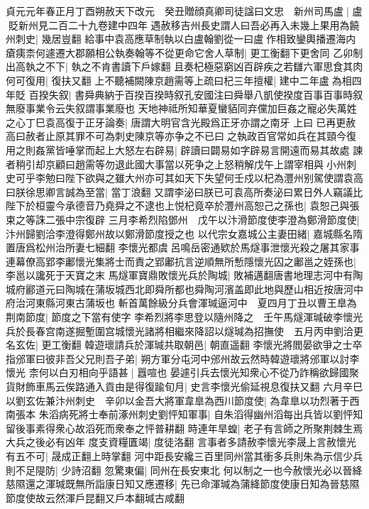 貞元元年春正月丁酉朔赦天下改元　癸丑贈顔真卿司徒諡曰文忠　新州司馬盧|{
	盧貶新州見二百二十九卷建中四年}
遇赦移吉州長史謂人曰吾必再入未幾上果用為饒州刺史|{
	幾居豈翻}
給事中袁高應草制執以白盧翰劉從一曰盧作相致鑾輿播遷海内瘡痍柰何遽遷大郡願相公執奏翰等不從更命它舍人草制|{
	更工衡翻下更舍同}
乙卯制出高執之不下|{
	執之不肯書讀下戶嫁翻}
且奏杞極惡窮凶百辟疾之若讎六軍思食其肉何可復用|{
	復扶又翻}
上不聽補闕陳京趙需等上疏曰杞三年擅權|{
	建中二年盧為相四年貶}
百揆失叙|{
	書舜典納于百揆百揆時叙孔安國注曰舜舉八凱使揆度百事百事時叙無廢事業令云失叙謂事業廢也}
天地神祗所知華夏蠻貊同弃儻加巨姦之寵必失萬姓之心丁巳袁高復于正牙論奏|{
	唐謂大明官含光殿爲正牙亦謂之南牙}
上曰已再更赦高曰赦者止原其罪不可為刺史陳京等亦争之不已曰之執政百官常如兵在其頸今復用之則姦黨皆唾掌而起上大怒左右辟易|{
	辟讀曰闢易如字辟易言開遠而易其故處}
諫者稍引却京顧曰趙需等勿退此國大事當以死争之上怒稍解戊午上謂宰相與小州刺史可乎李勉曰陛下欲與之雖大州亦可其如天下失望何壬戍以杞為灃州别駕使謂袁高曰朕徐思卿言誠為至當|{
	當丁浪翻}
又謂李泌曰朕已可袁高所奏泌曰累日外人竊議比陛下於桓靈今承德音乃堯舜之不逮也上悦杞竟卒於灃州高恕己之孫也|{
	袁恕己與張束之等誅二張中宗復辟}
三月李希烈陷鄧州　戊午以汴滑節度使李澄為鄭滑節度使|{
	汴州歸劉洽李澄得鄭州故以鄭滑節度授之也}
以代宗女嘉城公主妻田緒|{
	嘉城縣名隋置唐爲松州治所妻七細翻}
李懷光都虞呂鳴岳密通欵於馬燧事泄懷光殺之屠其家事連幕僚高郢李鄘懷光集將士而責之郢鄘抗言逆順無所慙隱懷光囚之鄘邕之姪孫也|{
	李邕以讒死于天寶之末}
馬燧軍寶鼎敗懷光兵於陶城|{
	敗補邁翻唐書地理志河中有陶城府酈道元曰陶城在蒲坂城西北即舜所都也舜陶河濱盖即此地與歷山相近按唐河中府治河東縣河東古蒲坂也}
斬首萬餘級分兵會渾瑊逼河中　夏四月丁丑以曹王臯為荆南節度|{
	節度之下當有使字}
李希烈將李思登以隨州降之　壬午馬燧渾瑊破李懷光兵於長春宫南遂掘塹圍宫城懷光諸將相繼來降詔以燧瑊為招撫使　五月丙申劉洽更名玄佐|{
	更工衡翻}
韓遊瓌請兵於渾瑊共取朝邑|{
	朝直遥翻}
李懷光將閻晏欲爭之士卒指邠軍曰彼非吾父兄則吾子弟|{
	朔方軍分屯河中邠州故云然時韓遊瓌將邠軍以討李懷光}
柰何以白刃相向乎語甚|{
	囂喧也}
晏遽引兵去懷光知衆心不從乃詐稱欲歸國聚貨財飾車馬云俟路通入貢由是得復踰旬月|{
	史言李懷光偷延視息復扶又翻}
六月辛巳以劉玄佐兼汴州刺史　辛卯以金吾大將軍韋臯為西川節度使|{
	為韋臯以功烈著于西南張本}
朱滔病死將士奉前涿州刺史劉怦知軍事|{
	自朱滔得幽州滔每出兵皆以劉怦知留後事素得衆心故滔死而衆奉之怦普耕翻}
時連年旱蝗|{
	老子有言師之所聚荆棘生焉大兵之後必有凶年}
度支資糧匱竭|{
	度徒洛翻}
言事者多請赦李懷光李晟上言赦懷光有五不可|{
	晟成正翻上時掌翻}
河中距長安纔三百里同州當其衝多兵則朱為示信少兵則不足隄防|{
	少詩沼翻}
忽驚東偏|{
	同州在長安東北}
何以制之一也今赦懷光必以晉絳慈隰還之渾瑊既無所詣康日知又應遷移|{
	先已命渾瑊為蒲絳節度使康日知為晉慈隰節度使故云然渾戶昆翻又戶本翻瑊古咸翻}
